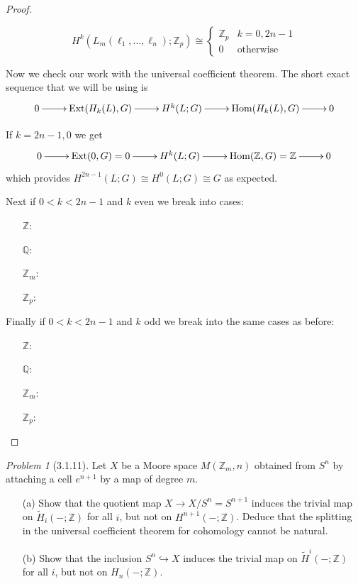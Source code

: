 \documentclass[10pt]{article}
\newcommand{\sk}{\vskip 10mm}
\newcommand{\bb}[1]{\mathbb{#1}}
\newcommand{\rH}{\widetilde{H}}
\DeclareMathOperator{\Ext}{Ext}
\DeclareMathOperator{\Hom}{Hom}
\theoremstyle{remark}
\newtheorem{problem}{Problem}
\begin{document}
\begin{proof}
\begin{itemize}
    \[
      H^k(L_m(\ell_1,\ldots,\ell_n);\bb{Z}_p) \cong  
      \left\{
        \begin{array}{ll}
          \bb{Z}_p & k=0,2n-1\\
          0 & \text{otherwise}
        \end{array}
      \right.
    \]
  \end{itemize}

  Now we check our work with the universal coefficient theorem. The
  short exact sequence that we will be using is
  \[
    \xymatrix{
      0 \ar[r] & \Ext(H_k(L),G) \ar[r] & H^k(L;G) \ar[r] & \Hom(H_k(L),G) \ar[r] & 0
    }
  \]

  If $k=2n-1,0$ we get
  \[
    \xymatrix{
      0 \ar[r] & \Ext(0,G)=0 \ar[r] & H^k(L;G) \ar[r] & \Hom(\bb{Z},G)=\bb{Z} \ar[r] & 0
    }
  \]
  which provides $H^{2n-1}(L;G)\cong H^0(L;G)\cong G$ as expected.

  Next if $0<k<2n-1$ and $k$ even we break into cases:
  \begin{itemize}
  \item[$\bb{Z}$:]
  \item[$\bb{Q}$:]
  \item[$\bb{Z}_m$:]
  \item[$\bb{Z}_p$:]
  \end{itemize}

  Finally if $0<k<2n-1$ and $k$ odd we break into the same cases as before:
  \begin{itemize}
  \item[$\bb{Z}$:]
  \item[$\bb{Q}$:]
  \item[$\bb{Z}_m$:]
  \item[$\bb{Z}_p$:]
  \end{itemize}
\end{proof}

\sk

\begin{problem}[3.1.11]
  Let $X$ be a Moore space $M(\bb{Z}_m,n)$ obtained from $S^n$ by attaching
  a cell $e^{n+1}$ by a map of degree $m$.
  \begin{itemize}
  \item[(a)] Show that the quotient map $X\rightarrow X/S^n=S^{n+1}$ induces the
    trivial map on $\rH_i(-;\bb{Z})$ for all $i$, but not on
    $H^{n+1}(-;\bb{Z})$. Deduce that the splitting in the universal coefficient
    theorem for cohomology cannot be natural.
  \item[(b)] Show that the inclusion $S^n\hookrightarrow X$ induces the trivial
    map on $\rH^i(-;\bb{Z})$ for all $i$, but not on $H_n(-;\bb{Z})$.
  \end{itemize}
\end{problem}
\end{document}
